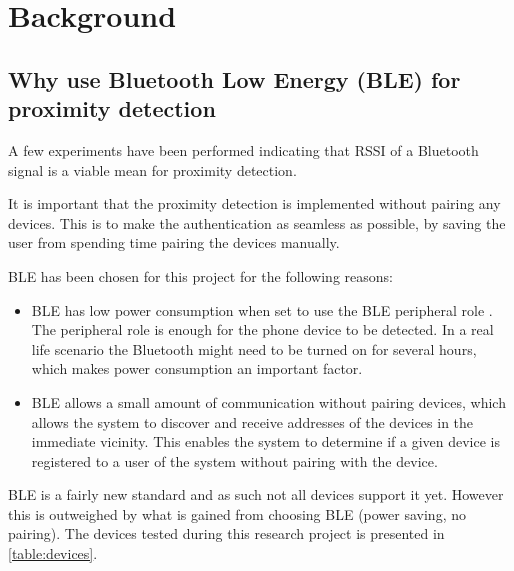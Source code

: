 \section{Background}

\subsection{Why use Bluetooth Low Energy (BLE) for proximity detection}

A few experiments have been performed indicating that RSSI of a Bluetooth signal is a viable mean for proximity detection\cite{ref:Takashi}. 

It is important that the proximity detection is implemented without pairing any devices. This is to make the authentication as seamless as possible, by saving the user from spending time pairing the devices manually.

BLE has been chosen for this project for the following reasons:
\begin{itemize}
	\item BLE has low power consumption when set to use the BLE peripheral role \cite{ref:Power_usage}. The peripheral role is enough for the phone device to be detected. In a real life scenario the Bluetooth might need to be turned on for several hours, which makes power consumption an important factor.
	\item BLE allows a small amount of communication without pairing devices, which allows the system to discover and receive addresses of the devices in the immediate vicinity. This enables the system to determine if a given device is registered to a user of the system without pairing with the device.
\end{itemize}

BLE is a fairly new standard and as such not all devices support it yet. However this is outweighed by what is gained from choosing BLE (power saving, no pairing\cite{ref:Power_usage}). The devices tested during this research project is presented in \cref{table:devices}.

